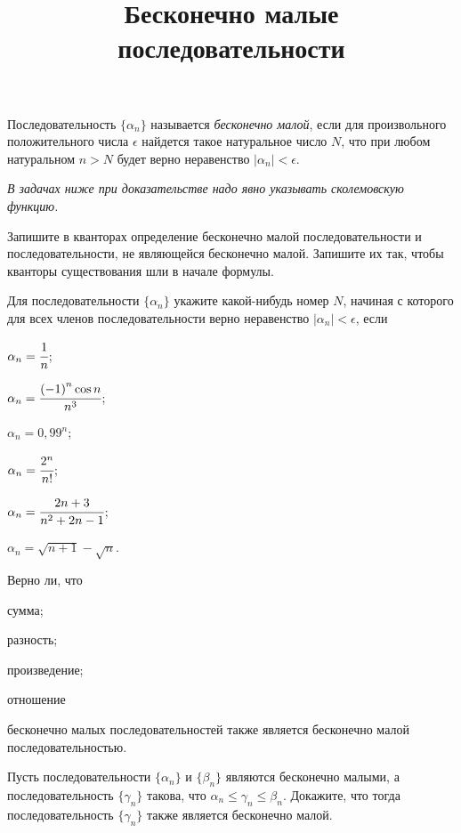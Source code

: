 \documentclass[a4paper, 12pt, num=26]{listok}
\begin{document}
\title{Бесконечно малые последовательности}
\maketitle{}
\begin{definition}
	Последовательность $\{\alpha_n\}$ называется \textit{бесконечно малой}, если для произвольного положительного числа $\epsilon$
	найдется такое натуральное число $N$, что при любом натуральном $n > N$ будет верно неравенство $|\alpha_n| < \epsilon$.
\end{definition}
\begin{center}
	\textit{В задачах ниже при доказательстве надо явно указывать сколемовскую функцию.}
\end{center}
\begin{problem}
	Запишите в кванторах определение бесконечно малой последовательности и последовательности, не являющейся бесконечно малой.
	Запишите их так, чтобы кванторы существования шли в начале формулы.
\end{problem}
\begin{problem}
	Для последовательности $\{\alpha_n\}$ укажите какой-нибудь номер $N$, начиная с которого для всех членов последовательности верно неравенство
	$|\alpha_n| < \epsilon$, если
	\begin{multienum}{3}
		\item $\alpha_n = \cfrac1n$;
		\item $\alpha_n = \cfrac{{(-1)}^n \cos n}{n^3}$;
		\item $\alpha_n = {0{,}99}^n$;
		\item $\alpha_n = \cfrac{2^n}{n!}$;
		\item $\alpha_n = \cfrac{2n+3}{n^2+2n-1}$;
		\item $\alpha_n = \sqrt{n + 1} - \sqrt n$.
	\end{multienum}
\end{problem}
\begin{problem}
	Верно ли, что
	\begin{probparts}
		\item сумма;
		\item разность;
		\item произведение;
		\item отношение
	\end{probparts}
	бесконечно малых последовательностей также является бесконечно малой последовательностью.
\end{problem}
\begin{problem}
	Пусть последовательности $\{\alpha_n\}$ и $\{\beta_n\}$ являются бесконечно малыми,
	а последовательность $\{\gamma_n\}$ такова, что $\alpha_n \le \gamma_n \le \beta_n$.
	Докажите, что тогда последовательность $\{\gamma_n\}$ также является бесконечно малой.
\end{problem}
\end{document}
